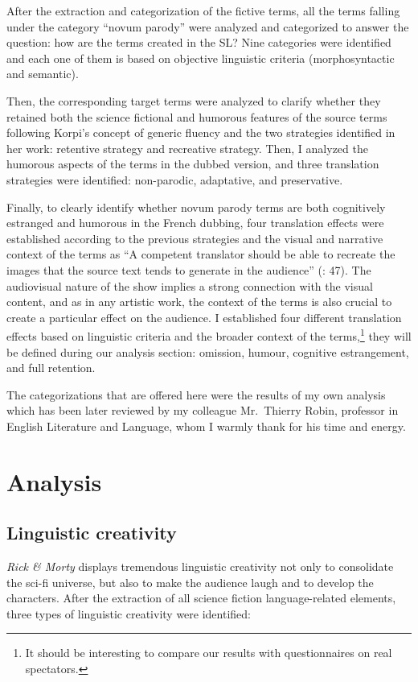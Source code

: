 \documentclass[output=paper]{langscibook}
\begin{document}
After the extraction and categorization of the fictive terms, all the terms falling under the category “novum parody” were analyzed and categorized to answer the question: how are the terms created in the SL? Nine categories were identified and each one of them is based on objective linguistic criteria (morphosyntactic and semantic).

Then, the corresponding target terms were analyzed to clarify whether they retained both the science fictional and humorous features of the source terms following Korpi’s concept of generic fluency and the two strategies identified in her work: retentive strategy and recreative strategy. Then, I analyzed the humorous aspects of the terms in the dubbed version, and three translation strategies were identified: non-parodic, adaptative, and preservative.

Finally, to clearly identify whether novum parody terms are both cognitively estranged and humorous in the French dubbing, four translation effects were established according to the previous strategies and the visual and narrative context of the terms as “A competent translator should be able to recreate the images that the source text tends to generate in the audience” (\citealt{ElejaldeSáenz2020}: 47).  The audiovisual nature of the show implies a strong connection with the visual content, and as in any artistic work, the context of the terms is also crucial to create a particular effect on the audience. I established four different translation effects based on linguistic criteria and the broader context of the terms,\footnote{It should be interesting to compare our results with questionnaires on real spectators.}  they will be defined during our analysis section: omission, humour, cognitive estrangement, and full retention.

The categorizations that are offered here were the results of my own analysis which has been later reviewed by my colleague Mr.~Thierry Robin, professor in English Literature and Language, whom I warmly thank for his time and energy.

\section{Analysis}

\subsection{Linguistic creativity}

\textit{Rick \& Morty} displays tremendous linguistic creativity not only to consolidate the sci-fi universe, but also to make the audience laugh and to develop the characters. After the extraction of all science fiction language-related elements, three types of linguistic creativity were identified:
\end{document}
